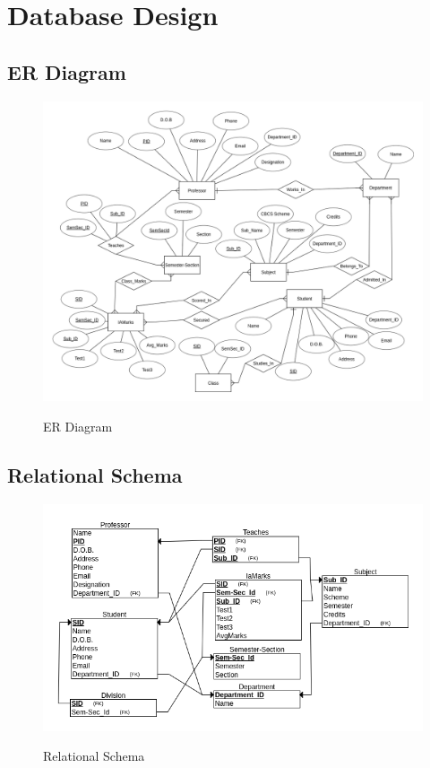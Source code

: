 \chapter{Database Design}

\section{ER Diagram}
\begin{figure}[H]
\centering
\caption{ER Diagram}
\includegraphics[scale=0.47]{./erd.png}
\label{fig:ER diagram}
\end{figure}

\thispagestyle{fancy}

\section{Relational Schema}
\begin{figure}[H]
\centering
\caption{Relational Schema}
\includegraphics[scale=.7]{./schema.png}
\\[0.2in]
\label{fig:Relational Schema}
\end{figure}

\thispagestyle{fancy}

